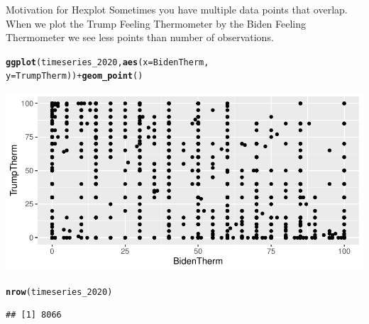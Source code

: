 \documentclass{beamer}\usepackage[]{graphicx}\usepackage[]{xcolor}
\makeatletter
\newcommand{\hlopt}[1]{\textcolor[rgb]{0,0,0}{#1}}%
\newcommand{\hlstd}[1]{\textcolor[rgb]{0.345,0.345,0.345}{#1}}%
\newcommand{\hlkwc}[1]{\textcolor[rgb]{0.333,0.667,0.333}{#1}}%
\newcommand{\hlkwd}[1]{\textcolor[rgb]{0.737,0.353,0.396}{\textbf{#1}}}%
\newenvironment{kframe}{%
 \def\at@end@of@kframe{}%
 \ifinner\ifhmode%
  \def\at@end@of@kframe{\end{minipage}}%
  \begin{minipage}{\columnwidth}%
 \fi\fi%
 \def\FrameCommand##1{\hskip\@totalleftmargin \hskip-\fboxsep
 \colorbox{shadecolor}{##1}\hskip-\fboxsep
     \hskip-\linewidth \hskip-\@totalleftmargin \hskip\columnwidth}%
 \MakeFramed {\advance\hsize-\width
   \@totalleftmargin\z@ \linewidth\hsize
   \@setminipage}}%
 {\par\unskip\endMakeFramed%
 \at@end@of@kframe}
\newenvironment{knitrout}{}{} %
\makeatother
\begin{document}
\begin{frame}[fragile]{Motivation for Hexplot}
Sometimes you have multiple data points that overlap.  When we plot the Trump Feeling Thermometer by the Biden Feeling Thermometer we see less points than number of observations.
\begin{knitrout}
\color{fgcolor}\begin{kframe}
\begin{alltt}
\hlkwd{ggplot}\hlstd{(timeseries_2020,} \hlkwd{aes}\hlstd{(}\hlkwc{x} \hlstd{= BidenTherm,}
    \hlkwc{y} \hlstd{= TrumpTherm))} \hlopt{+} \hlkwd{geom_point}\hlstd{()}
\end{alltt}
\end{kframe}
\includegraphics[width=0.95\linewidth]{figure/unnamed-chunk-80-1} 
\begin{kframe}\begin{alltt}
\hlkwd{nrow}\hlstd{(timeseries_2020)}
\end{alltt}
\begin{verbatim}
## [1] 8066
\end{verbatim}
\end{kframe}
\end{knitrout}
\end{frame}
\end{document}
